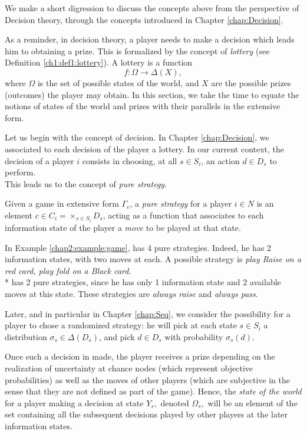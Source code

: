 We make a short digression to discuss the concepts above from the perspective of Decision theory, through the concepts introduced in Chapter \ref{chap:Decision}.

As a reminder, in decision theory, a player needs to make a decision which leads him to obtaining a prize. This is formalized by the concept of \emph{lottery} (see Definition \ref{ch1:def1:lottery}).
A lottery is a function
$$f : \Omega \rightarrow \Delta(X), $$
where $\Omega$ is the set of possible states of the world, and $X$ are the possible prizes (outcomes) the player may obtain. In this section, we take the time to equate the notions of states of the world and prizes with their parallels in the extensive form.

Let us begin with the concept of decision. In Chapter \ref{chap:Decision}, we associated to each decision of the player a lottery.
 In our current context, the decision of a player $i$ consists in choosing, at all $s \in S_i$, an action $d \in D_s$ to perform.\\
 This leads us to the concept of \emph{pure strategy}. \\
 \begin{definition} 
Given a game in extensive form $\Gamma_e$, a \emph{pure strategy} for a player $i \in N$ is an element
$c \in C_i = \times_{s \in S_i} D_s$, acting as a function that associates to each information  state of the player a \emph{move} to be played at that state.
\end{definition}
\begin{example}
In Example \ref{chap2:example:game},
\TAtwo{} has 4 pure strategies. Indeed, he has 2 information states,
with two moves at each. A possible strategy is
\emph{play Raise on a red card, play fold on a Black card}.\\*
\TAone{} has 2 pure strategies, since he has only 1 information state and 2 available moves at this state.
These strategies are \emph{always raise} and \emph{always pass}.
\end{example}
 Later, and in particular in Chapter \ref{chap:Seq}, we consider the possibility for a player to chose a randomized strategy: he will pick at each state $s \in S_i$ a distribution $\sigma_s \in \Delta(D_s)$, and pick $d \in D_s$ with probability $\sigma_s(d)$.

Once such a decision in made, the player receives a prize depending on the realization of uncertainty at chance nodes (which represent objective probabilities) as well as the moves of other players (which are subjective in the sense that they are not defined as part of the game). Hence, the \emph{state of the world} for a player making a decision at state $Y_s,$ denoted $\Omega_s,$ will be an element of the set containing all the subsequent decisions played by other players at the later information states.

